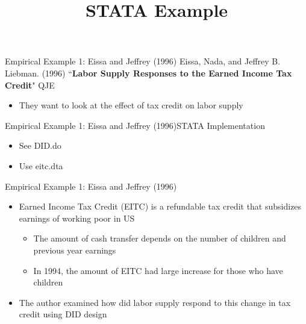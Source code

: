 \documentclass[dvipsnames,hyperref={pdfpagelabels=false}]{beamer}
\begin{document}
\title[]  
{STATA Example}


\author 
{}

\institute{}






\date
{}


\begin{frame}{}
\titlepage
\end{frame}





\begin{frame}{Empirical Example 1: Eissa and Jeffrey (1996)}
Eissa, Nada, and Jeffrey B. Liebman. (1996) ``\textbf{Labor Supply Responses to the Earned Income Tax Credit}" QJE
\begin{itemize}
\vspace{0.2cm}
\item They want to look at the effect of tax credit on labor supply


\end{itemize}
\end{frame}



\begin{frame}{Empirical Example 1: Eissa and Jeffrey (1996)}{STATA Implementation}
\begin{itemize}
\item See DID.do
\vspace{0.2cm}
\item Use eitc.dta


\end{itemize}
\end{frame}





\begin{frame}{Empirical Example 1: Eissa and Jeffrey (1996)}
\begin{itemize}
\item Earned Income Tax Credit (EITC) is a refundable tax credit that subsidizes earnings of working poor in US
\vspace{0.2cm} 
\begin{itemize}
\item The amount of cash transfer depends on the number of children and previous year earnings
\vspace{0.2cm}
\item In 1994, the amount of EITC had large increase for those who have children
\vspace{0.2cm}
\end{itemize}
\item The author examined how did labor supply respond to this change in tax credit using DID design

\end{itemize}
\end{frame}
\end{document}
